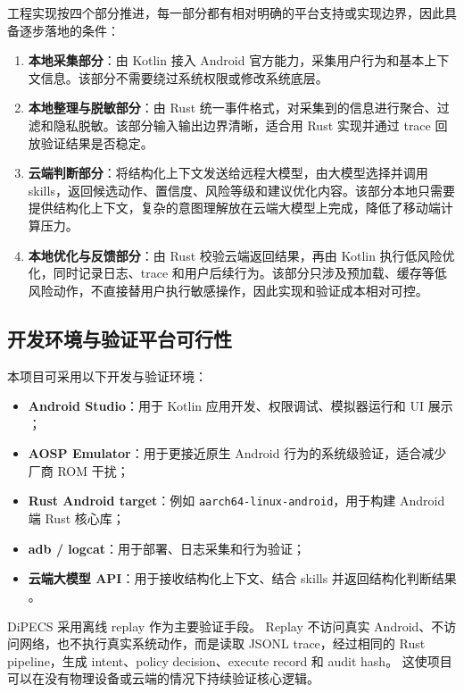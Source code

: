 \documentclass[12pt,a4paper]{article}
\begin{document}
工程实现按四个部分推进，每一部分都有相对明确的平台支持或实现边界，因此具备逐步落地的条件：

\begin{enumerate}[label=(\arabic*)]
  \item \textbf{本地采集部分}：由 Kotlin 接入 Android 官方能力，采集用户行为和基本上下文信息。该部分不需要绕过系统权限或修改系统底层。
  \item \textbf{本地整理与脱敏部分}：由 Rust 统一事件格式，对采集到的信息进行聚合、过滤和隐私脱敏。该部分输入输出边界清晰，适合用 Rust 实现并通过 trace 回放验证结果是否稳定。
  \item \textbf{云端判断部分}：将结构化上下文发送给远程大模型，由大模型选择并调用 skills，返回候选动作、置信度、风险等级和建议优化内容。该部分本地只需要提供结构化上下文，复杂的意图理解放在云端大模型上完成，降低了移动端计算压力。
  \item \textbf{本地优化与反馈部分}：由 Rust 校验云端返回结果，再由 Kotlin 执行低风险优化，同时记录日志、trace 和用户后续行为。该部分只涉及预加载、缓存等低风险动作，不直接替用户执行敏感操作，因此实现和验证成本相对可控。
\end{enumerate}

\subsection{开发环境与验证平台可行性}\label{subsec:validation-env}

本项目可采用以下开发与验证环境：

\begin{itemize}
  \item \textbf{Android Studio}：用于 Kotlin 应用开发、权限调试、模拟器运行和 UI 展示 \cite{android-emulator}；
  \item \textbf{AOSP Emulator}：用于更接近原生 Android 行为的系统级验证，适合减少厂商 ROM 干扰；
  \item \textbf{Rust Android target}：例如 \texttt{aarch64-linux-android}，用于构建 Android 端 Rust 核心库；
  \item \textbf{adb / logcat}：用于部署、日志采集和行为验证；
  \item \textbf{云端大模型 API}：用于接收结构化上下文、结合 skills 并返回结构化判断结果 \cite{deepseek-api}。
\end{itemize}

DiPECS 采用离线 replay 作为主要验证手段。
Replay 不访问真实 Android、不访问网络，也不执行真实系统动作，而是读取 JSONL trace，经过相同的 Rust pipeline，生成 intent、policy decision、execute record 和 audit hash。
这使项目可以在没有物理设备或云端的情况下持续验证核心逻辑。
\end{document}
